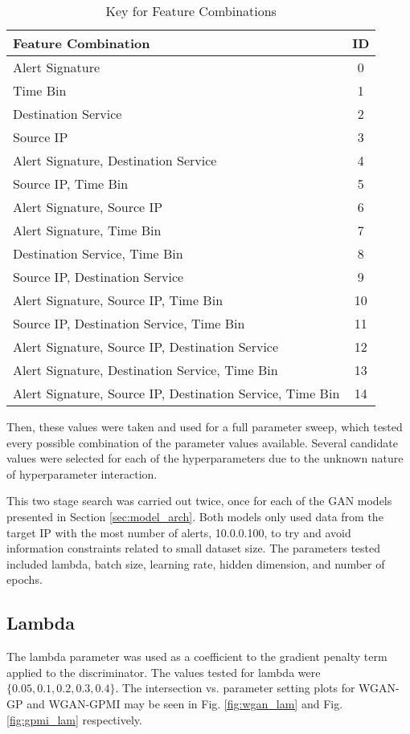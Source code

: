 \begin{table}[!htbp]
	\caption{Key for Feature Combinations}
	\label{tab:key}
	\centering
	\begin{tabular}{l|c}
		\textbf{Feature Combination} & \textbf{ID} \\ \hline
		Alert Signature & 0 \\
		Time Bin & 1 \\
		Destination Service & 2 \\
		Source IP & 3 \\
		Alert Signature, Destination Service & 4 \\
		Source IP, Time Bin & 5 \\
		Alert Signature, Source IP & 6 \\
		Alert Signature, Time Bin & 7 \\
		Destination Service, Time Bin & 8 \\
		Source IP, Destination Service & 9 \\
		Alert Signature, Source IP, Time Bin & 10 \\
		Source IP, Destination Service, Time Bin & 11 \\
		Alert Signature, Source IP, Destination Service & 12 \\
		Alert Signature, Destination Service, Time Bin & 13 \\
		Alert Signature, Source IP, Destination Service, Time Bin & 14
	\end{tabular}
\end{table}

Then, these values were taken and used for a full parameter sweep, which tested every possible combination of the parameter values available. Several candidate values were selected for each of the hyperparameters due to the unknown nature of hyperparameter interaction.

This two stage search was carried out twice, once for each of the GAN models presented in Section \ref{sec:model_arch}. Both models only used data from the target IP with the most number of alerts, 10.0.0.100, to try and avoid information constraints related to small dataset size. The parameters tested included lambda, batch size, learning rate, hidden dimension, and number of epochs.

\subsection{Lambda}
\label{sec:lam}
The lambda parameter was used as a coefficient to the gradient penalty term applied to the discriminator. The values tested for lambda were $\{0.05, 0.1, 0.2, 0.3, 0.4\}$. The intersection vs. parameter setting plots for WGAN-GP and WGAN-GPMI may be seen in Fig. \ref{fig:wgan_lam} and Fig. \ref{fig:gpmi_lam} respectively.


